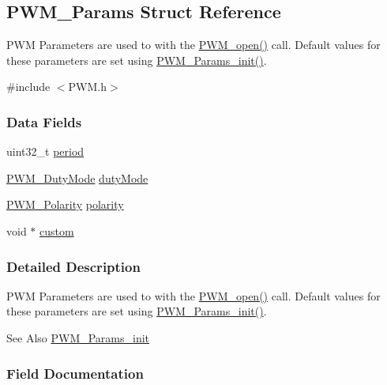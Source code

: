 \subsection{P\-W\-M\-\_\-\-Params Struct Reference}
\label{struct_p_w_m___params}


P\-W\-M Parameters are used to with the \hyperlink{_p_w_m_8h_ac963beab0c5c6901bf852f175028aeaf}{P\-W\-M\-\_\-open()} call. Default values for these parameters are set using \hyperlink{_p_w_m_8h_acbdd3192f9f06bf689e4a3855926dcac}{P\-W\-M\-\_\-\-Params\-\_\-init()}.  




{\ttfamily \#include $<$P\-W\-M.\-h$>$}

\subsubsection*{Data Fields}
\begin{DoxyCompactItemize}
\item 
uint32\-\_\-t \hyperlink{struct_p_w_m___params_a6c88aaea599f9584db7b56fb2b1045f7}{period}
\item 
\hyperlink{_p_w_m_8h_a6c5ba2703cb9cc02773b5073046c1607}{P\-W\-M\-\_\-\-Duty\-Mode} \hyperlink{struct_p_w_m___params_ab054d20d938b0a6a2c93e1470aa42d15}{duty\-Mode}
\item 
\hyperlink{_p_w_m_8h_affa60cc974f99db4aeafc9f6524ec593}{P\-W\-M\-\_\-\-Polarity} \hyperlink{struct_p_w_m___params_ab8a3786f6ac3ca5306b9c57ba6fccede}{polarity}
\item 
void $\ast$ \hyperlink{struct_p_w_m___params_a37396e0fa9aac45d2a8292cf5d653471}{custom}
\end{DoxyCompactItemize}


\subsubsection{Detailed Description}
P\-W\-M Parameters are used to with the \hyperlink{_p_w_m_8h_ac963beab0c5c6901bf852f175028aeaf}{P\-W\-M\-\_\-open()} call. Default values for these parameters are set using \hyperlink{_p_w_m_8h_acbdd3192f9f06bf689e4a3855926dcac}{P\-W\-M\-\_\-\-Params\-\_\-init()}. 

\begin{DoxySeeAlso}{See Also}
\hyperlink{_p_w_m_8h_acbdd3192f9f06bf689e4a3855926dcac}{P\-W\-M\-\_\-\-Params\-\_\-init} 
\end{DoxySeeAlso}


\subsubsection{Field Documentation}
